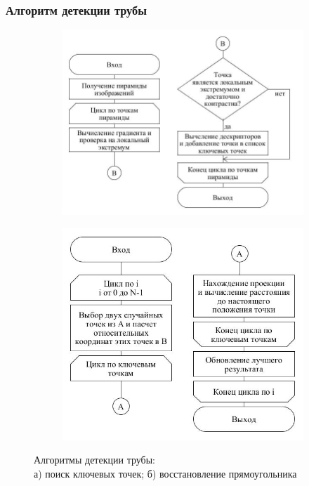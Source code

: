 \documentclass[t]{beamer}
\begin{document}
	\begin{frame}
		\frametitle{Алгоритм детекции трубы}
		\vspace*{-0.2cm}
		\begin{figure}[ht!]
			\begin{subfigure}{.51\textwidth}
				\centering
				\includegraphics[width = \textwidth]{image/trubadetection}
				\vspace*{-0.6cm}
				\caption{}
			\end{subfigure}
			\begin{subfigure}{.46\textwidth}
				\centering
				\includegraphics[width = \textwidth]{image/RanSaC}
				\vspace*{-0.6cm}
				\caption{}
			\end{subfigure}
			\centering
			\vspace*{-0.3cm}
			\caption{Алгоритмы детекции трубы:\\ а) поиск ключевых точек; б) восстановление прямоугольника}
			\label{fig:Examples}
		\end{figure}
		
	\end{frame}
\end{document}
